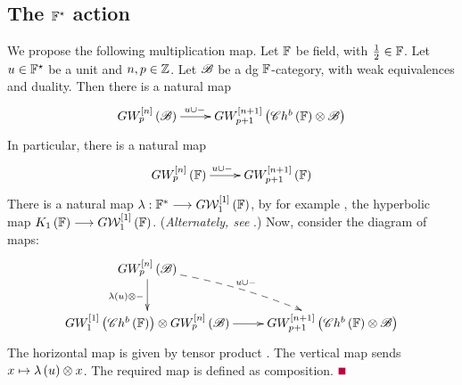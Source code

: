\documentclass[12pt]{article}
\begin{document}
\subsection{The ${\mathbb{F}}^{\star}$ action} 
We propose the following multiplication map. 
\bP\label{unitHike}{\rm 
Let ${\mathbb{F}}$ be field, with $\frac{1}{2}\in {\mathbb{F}}$. Let  $u\in {\mathbb{F}}^{\star}$ be a unit and $n, p \in {\mathbb {Z}}$. Let ${\mathscr {B}}$ be a dg ${\mathbb{F}}$-category, with weak equivalences and duality. Then there is a natural map
$$
\diagram 
GW_p^{\LRt{n}}\LRf{{\SB}} \ar[r]^{u\cup -\qquad \quad} & GW_{p+1}^{\LRt{n+1}}\LRf{{\SC}h^b\LRf{{\BF}}\otimes {\SB}} \\
\enddiagram 
$$
In particular, there is a  natural map
$$
\diagram 
GW_p^{\LRt{n}}\LRf{{\BF}} \ar[r]^{u\cup -\quad } & GW_{p+1}^{\LRt{n+1}}\LRf{{\BF}} \\
\enddiagram 
$$
}
\eP 
\pf There is a natural map $\lambda: {\mathbb{F}}^* \longrightarrow G{\mathcal{W}}_1^{\left[ 1\right]}\left( {\mathbb{F}}\right)$, by for example \cite[pp 1784]{S17}, the hyperbolic map
$K_1\left( {\mathbb{F}}\right) \longrightarrow G{\mathcal{W}}_1^{\left[ 1\right]}\left( {\mathbb{F}}\right)$. ({\it Alternately, see} \cite[pp 67]{BL8}.)
Now, 
consider the diagram of maps:
$$
\diagram 
GW_p^{\LRt{n}}\LRf{{\SB}}\ar[d]_{\lambda(u)\otimes -} \ar@/^/@{-->}[rd]^{u \cup -}& \\
GW_1^{\LRt{1}}\LRf{{\SC}h^b\LRf{{\BF}}} \otimes GW_p^{\LRt{n}}\LRf{{\SB}}\ar[r] & GW_{p+1}^{\LRt{n+1}}\LRf{{\SC}h^b\LRf{{\BF}}\otimes {\SB}}\\
\enddiagram
$$
The horizontal map is given by tensor product \cite[pp 1782]{S17}. The vertical map sends $x\mapsto \lambda\left( u\right) 
\otimes x$. The required map    is defined as composition. 
\pic $\eop$

\end{document}

